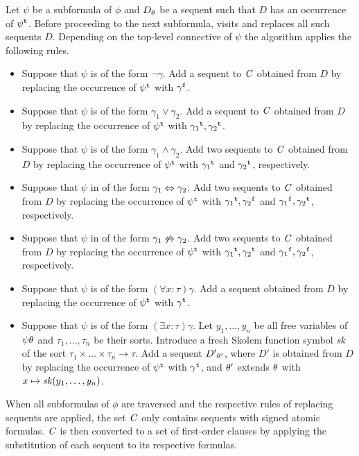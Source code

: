 Let $\psi$ be a subformula of $\phi$ and ${D}_{\theta}$ be a sequent such that $D$ has an occurrence of ${\psi}^{\mathtt{t}}$.
Before proceeding to the next subformula, \newcnf{} visits and replaces all such sequents $D$.
%
Depending on the top-level connective of $\psi$ the algorithm applies the following rules.
\begin{itemize}
\item
Suppose that $\psi$ is of the form $\neg \gamma$. Add a sequent to $\mathit{C}$ obtained from $D$ by replacing the occurrence of ${\psi}^{\mathtt{t}}$ with ${\gamma}^{\mathtt{f}}$.

\item
Suppose that $\psi$ is of the form $\gamma_1 \lor \gamma_2$. Add a sequent to $\mathit{C}$ obtained from $D$ by replacing the occurrence of ${\psi}^{\mathtt{t}}$ with ${\gamma_1}^{\mathtt{t}}, {\gamma_2}^{\mathtt{t}}$.

\item
Suppose that $\psi$ is of the form $\gamma_1 \land \gamma_2$. Add two sequents to $\mathit{C}$ obtained from $D$ by replacing the occurrence of ${\psi}^{\mathtt{t}}$ with ${\gamma_1}^{\mathtt{t}}$ and ${\gamma_2}^{\mathtt{t}}$, respectively.

\item
Suppose that $\psi$ in of the form $\gamma_1 \Leftrightarrow \gamma_2$. Add two sequents to $\mathit{C}$ obtained from $D$ by replacing the occurrence of ${\psi}^{\mathtt{t}}$ with ${\gamma_1}^{\mathtt{t}}, {\gamma_2}^{\mathtt{f}}$ and ${\gamma_1}^{\mathtt{f}}, {\gamma_2}^{\mathtt{t}}$, respectively.

\item
Suppose that $\psi$ in of the form $\gamma_1 \not\Leftrightarrow \gamma_2$. Add two sequents to $\mathit{C}$ obtained from $D$ by replacing the occurrence of ${\psi}^{\mathtt{t}}$ with ${\gamma_1}^{\mathtt{t}}, {\gamma_2}^{\mathtt{t}}$ and ${\gamma_1}^{\mathtt{f}}, {\gamma_2}^{\mathtt{f}}$, respectively.

\item
Suppose that $\psi$ is of the form $(\forall x:\tau)\gamma$. Add a sequent obtained from $D$ by replacing the occurrence of ${\psi}^{\mathtt{t}}$ with ${\gamma}^{\mathtt{t}}$.

\item
Suppose that $\psi$ is of the form $(\exists x:\tau)\gamma$. Let $y_1,\ldots,y_n$ be all free variables of $\psi \theta$ and $\tau_1,\ldots,\tau_n$ be their sorts. Introduce a fresh Skolem function symbol $\mathit{sk}$ of the sort $\tau_1\times\ldots\times\tau_n\to\tau$. Add a sequent ${D'}_{\theta'}$, where $D'$ is obtained from $D$ by replacing the occurrence of ${\psi}^{\mathtt{t}}$ with ${\gamma}^{\mathtt{t}}$, 
and $\theta'$ extends $\theta$ with $x \mapsto \mathit{sk}(y_1,\ldots,y_n)$.
\end{itemize}
%
When all subformulas of $\phi$ are traversed and the respective rules of replacing sequents are applied, the set $\mathit{C}$ only contains sequents with signed atomic formulas. $\mathit{C}$ is then converted to a set of first-order clauses by applying the substitution of each sequent to its respective formulas.


